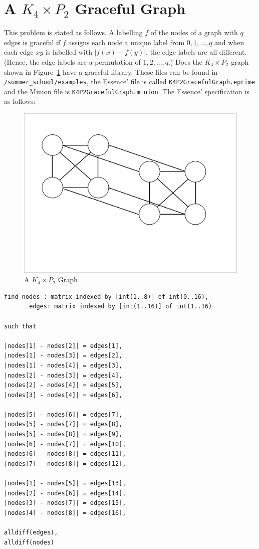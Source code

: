 \documentclass[oneside]{book}
\begin{document}
\section{A $K_4 \times P_2$ Graceful Graph}
This problem is stated as follows. A labelling $f$ of the nodes of a graph with $q$ edges is graceful if $f$ assigns each node a unique label from $0,1,..., q$ and when each edge $xy$ is labelled with $|f(x) - f(y)|$, the edge labels are all different. (Hence, the edge labels are a permutation of $1, 2, ..., q$.) Does the $K_4 \times P_2$ graph shown in Figure~\ref{fig:k4xp2} have a graceful library.  These files can be found in \texttt{/summer\_school/examples}, the Essence' file is called \texttt{K4P2GracefulGraph.eprime} and the Minion file is \texttt{K4P2GracefulGraph.minion}. The Essence' specification is as follows:

\begin{figure}[htp]
\centering
\includegraphics[scale=0.25] {k4xp2.pdf} 
\caption{A $K_4 \times P_2$ Graph }
\label{fig:k4xp2}
\end{figure}


\begin{verbatim}
find nodes : matrix indexed by [int(1..8)] of int(0..16),
       edges: matrix indexed by [int(1..16)] of int(1..16)

such that

|nodes[1] - nodes[2]| = edges[1],
|nodes[1] - nodes[3]| = edges[2],
|nodes[1] - nodes[4]| = edges[3],
|nodes[2] - nodes[3]| = edges[4],
|nodes[2] - nodes[4]| = edges[5],
|nodes[3] - nodes[4]| = edges[6],

|nodes[5] - nodes[6]| = edges[7],
|nodes[5] - nodes[7]| = edges[8],
|nodes[5] - nodes[8]| = edges[9],
|nodes[6] - nodes[7]| = edges[10],
|nodes[6] - nodes[8]| = edges[11],
|nodes[7] - nodes[8]| = edges[12],

|nodes[1] - nodes[5]| = edges[13],
|nodes[2] - nodes[6]| = edges[14],
|nodes[3] - nodes[7]| = edges[15],
|nodes[4] - nodes[8]| = edges[16],

alldiff(edges),
alldiff(nodes)
\end{verbatim}
\end{document}

